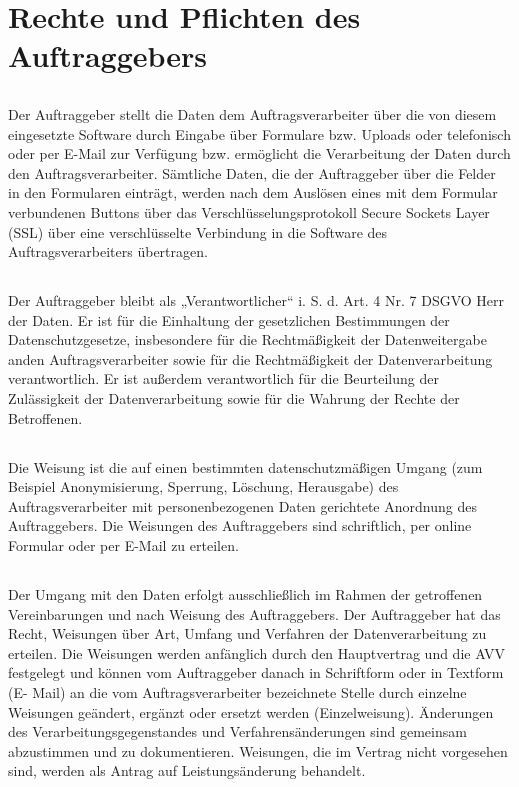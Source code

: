 \documentclass[10pt]{article}
\begin{document}
\section{Rechte und Pflichten des Auftraggebers}
\subsection{} Der Auftraggeber stellt die Daten dem Auftragsverarbeiter über die von diesem eingesetzte Software durch Eingabe über Formulare bzw. Uploads oder telefonisch oder per E-Mail zur Verfügung bzw. ermöglicht die Verarbeitung der Daten durch den Auftragsverarbeiter. Sämtliche Daten, die der Auftraggeber über die Felder in den Formularen einträgt, werden nach dem Auslösen eines mit dem Formular verbundenen Buttons über das Verschlüsselungsprotokoll Secure Sockets Layer (SSL) über eine verschlüsselte Verbindung in die Software des Auftragsverarbeiters übertragen.

\subsection{} Der Auftraggeber bleibt als „Verantwortlicher“ i. S. d. Art. 4 Nr. 7 DSGVO Herr der Daten. Er ist für die Einhaltung der gesetzlichen Bestimmungen der Datenschutzgesetze, insbesondere für die Rechtmäßigkeit der Datenweitergabe anden Auftragsverarbeiter sowie für die Rechtmäßigkeit der Datenverarbeitung
verantwortlich. Er ist außerdem verantwortlich für die Beurteilung der Zulässigkeit
der Datenverarbeitung sowie für die Wahrung der Rechte der Betroffenen.

\subsection{} Die Weisung ist die auf einen bestimmten datenschutzmäßigen Umgang (zum Beispiel Anonymisierung, Sperrung, Löschung, Herausgabe) des Auftragsverarbeiter mit personenbezogenen Daten gerichtete Anordnung des Auftraggebers. Die Weisungen des Auftraggebers sind schriftlich, per online Formular oder per E-Mail zu erteilen.

\subsection{} Der Umgang mit den Daten erfolgt ausschließlich im Rahmen der getroffenen
Vereinbarungen und nach Weisung des Auftraggebers. Der Auftraggeber hat das
Recht, Weisungen über Art, Umfang und Verfahren der Datenverarbeitung zu
erteilen. Die Weisungen werden anfänglich durch den Hauptvertrag und die AVV
festgelegt und können vom Auftraggeber danach in Schriftform oder in Textform (E-
Mail) an die vom Auftragsverarbeiter bezeichnete Stelle durch einzelne Weisungen
geändert, ergänzt oder ersetzt werden (Einzelweisung). Änderungen des
Verarbeitungsgegenstandes und Verfahrensänderungen sind gemeinsam
abzustimmen und zu dokumentieren. Weisungen, die im Vertrag nicht vorgesehen
sind, werden als Antrag auf Leistungsänderung behandelt.
\end{document}

